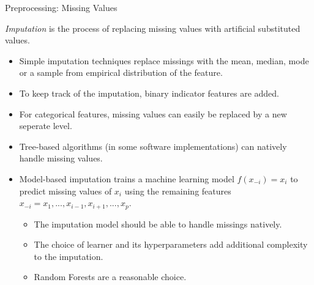 \begin{frame}{Preprocessing: Missing Values}

	\textit{Imputation} is the process of replacing missing values with artificial substituted values.

	\vspace{0.5cm}

	\begin{itemize}
		\item Simple imputation techniques replace missings with the mean, median, mode or a sample from empirical distribution of the feature.
		\item To keep track of the imputation, binary indicator features are added.
		\item For categorical features, missing values can easily be replaced by a new seperate level.
		\item Tree-based algorithms (in some software implementations) can natively handle missing values.
		\item Model-based imputation trains a machine learning model $f(x_{-i}) = x_i$ to predict missing values of $x_i$ using the remaining features $x_{-i} = x_1, ..., x_{i-1}, x_{i+1}, ..., x_p$.
		\begin{itemize}
			\item The imputation model should be able to handle missings natively.
			\item The choice of learner and its hyperparameters add additional complexity to the imputation.
			\item Random Forests are a reasonable choice.
		\end{itemize}
	\end{itemize}

\end{frame}

